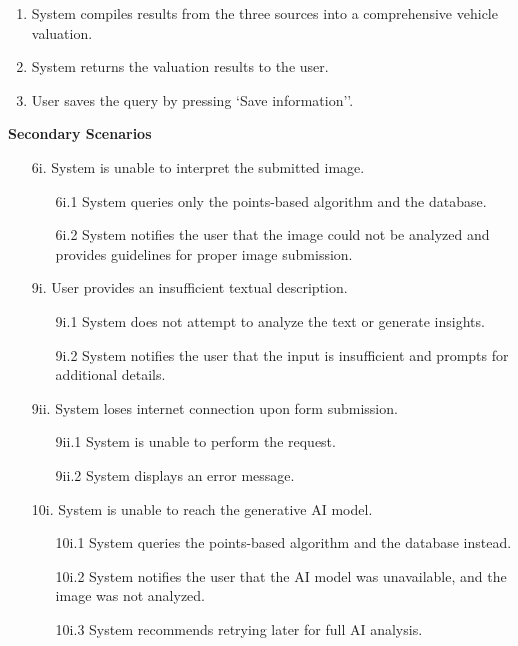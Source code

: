 \documentclass[]{article}
\begin{document}
\begin{enumerate}[{\bf {BE}1.}]
\begin{enumerate}[1.]
      \item System compiles results from the three sources into a comprehensive vehicle valuation.
      \item System returns the valuation results to the user.
      \item User saves the query by pressing `Save information''.
    \end{enumerate}
    \textbf{Secondary Scenarios}
    \begin{enumerate}
      \item[6i.] System is unable to interpret the submitted image.
      \begin{enumerate}
        \item[6i.1] System queries only the points-based algorithm and the database.
        \item[6i.2] System notifies the user that the image could not be analyzed and provides guidelines for proper image submission.
      \end{enumerate}
      \item[9i.] User provides an insufficient textual description.
      \begin{enumerate}
        \item[9i.1] System does not attempt to analyze the text or generate insights.
        \item[9i.2] System notifies the user that the input is insufficient and prompts for additional details.
      \end{enumerate}
      \item[9ii.] System loses internet connection upon form submission.
      \begin{enumerate}
        \item[9ii.1] System is unable to perform the request.
        \item[9ii.2] System displays an error message.
      \end{enumerate}
      \item[10i.] System is unable to reach the generative AI model.
      \begin{enumerate}
        \item[10i.1] System queries the points-based algorithm and the database instead.
        \item[10i.2] System notifies the user that the AI model was unavailable, and the image was not analyzed.
        \item[10i.3] System recommends retrying later for full AI analysis.
      \end{enumerate}
    \end{enumerate}


\end{enumerate}
\end{document}
